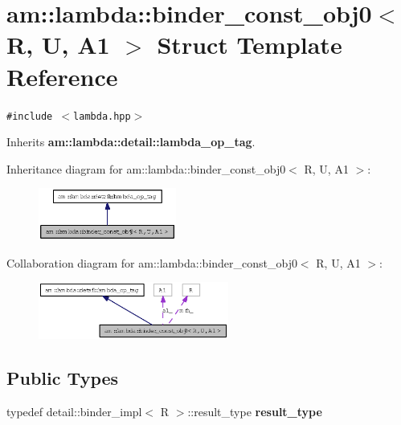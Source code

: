 \section{am::lambda::binder\_\-const\_\-obj0$<$ R, U, A1 $>$ Struct Template Reference}
\label{structam_1_1lambda_1_1binder__const__obj0}
{\tt \#include $<$lambda.hpp$>$}

Inherits {\bf am::lambda::detail::lambda\_\-op\_\-tag}.

Inheritance diagram for am::lambda::binder\_\-const\_\-obj0$<$ R, U, A1 $>$:\begin{figure}[H]
\begin{center}
\leavevmode
\includegraphics[width=128pt]{structam_1_1lambda_1_1binder__const__obj0__inherit__graph}
\end{center}
\end{figure}
Collaboration diagram for am::lambda::binder\_\-const\_\-obj0$<$ R, U, A1 $>$:\begin{figure}[H]
\begin{center}
\leavevmode
\includegraphics[width=177pt]{structam_1_1lambda_1_1binder__const__obj0__coll__graph}
\end{center}
\end{figure}
\subsection*{Public Types}
\begin{CompactItemize}
\item 
typedef detail::binder\_\-impl$<$ R $>$::result\_\-type \textbf{result\_\-type}\label{structam_1_1lambda_1_1binder__const__obj0_055117c27ab8352ae0e6e776b59745bd}

\end{CompactItemize}
